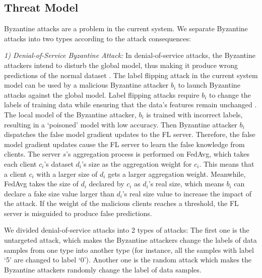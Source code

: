 \documentclass[journal]{IEEEtran}
\begin{document}
\subsection{Threat Model}
Byzantine attacks are a problem in the current system. We separate Byzantine attacks into two types according to the attack consequences:
\par \textit{1) Denial-of-Service Byzantine Attack:} In denial-of-service attacks, the Byzantine attackers intend to disturb the global model, thus making it produce wrong predictions of the normal dataset \cite{ref_04_model,ref_06_model,ref_07_data,yang2017generative,sun2018data}. The label flipping attack in the current system model can be used by a malicious Byzantine attacker $b_i$ to launch Byzantine attacks against the global model. Label flipping attacks require $b_i$ to change the labels of training data while ensuring that the data's features remain unchanged \cite{ref_18_label_flipping}. The local model of the Byzantine attacker, $b_i$ is trained with incorrect labels, resulting in a `poisoned' model with low accuracy. Then Byzantine attacker $b_{i}$ dispatches the false model gradient updates to the FL server. Therefore, the false model gradient updates cause the FL server to learn the false knowledge from clients. The server $s$'s aggregation process is performed on FedAvg, which takes each client $c_{i}$'s dataset $d_{i}$'s size as the aggregation weight for $c_{i}$. This means that a client $c_{i}$ with a larger size of $d_{i}$ gets a larger aggregation weight. Meanwhile, FedAvg takes the size of $d_{i}$ declared by $c_{i}$ as $d_{i}$'s real size, which means $b_{i}$ can declare a fake size value larger than $d_{i}$'s real size value to increase the impact of the attack. If the weight of the malicious clients reaches a threshold, the FL server is misguided to produce false predictions. 
\par We divided denial-of-service attacks into 2 types of attacks: The first one is the untargeted attack, which makes the Byzantine attackers change the labels of data samples from one type into another type (for instance, all the samples with label `5' are changed to label `0'). Another one is the random attack which makes the Byzantine attackers randomly change the label of data samples.
\end{document}
